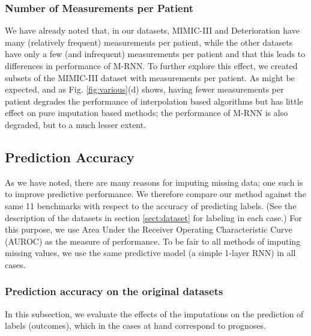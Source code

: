 \documentclass{article}
\begin{document}
\subsubsection{Number of Measurements per Patient}  We have already noted that, in our datasets, MIMIC-III and Deterioration have many (relatively frequent) measurements per patient, while the other datasets have only a few (and infrequent) measurements per patient and that this leads to differences in performance of M-RNN. To further explore this effect, we created subsets of the MIMIC-III dataset with  measurements per patient. As might be expected, and as Fig. \ref{fig:various}(d) shows, having fewer measurements per patient degrades the performance of  interpolation based algorithms but has little effect on pure imputation based methods; the performance of M-RNN is also degraded, but to a much lesser extent.

\subsection{Prediction Accuracy }  
As we have noted, there are many reasons for imputing missing data; one such is to improve predictive performance.  We therefore compare our method against the same 11 benchmarks with respect to the accuracy of predicting labels.  (See the description of the datasets in section \ref{sect:dataset} for labeling in each case.)  For this purpose, we use Area Under the Receiver Operating Characteristic Curve (AUROC) as the measure of performance. To be fair to all methods of imputing missing values, we use the same predictive model (a simple 1-layer RNN) in all cases.

\subsubsection{Prediction accuracy on the original datasets}
In this subsection, we evaluate the effects of the imputations on the prediction of labels (outcomes), which in the cases at hand correspond to prognoses. 
\end{document}
